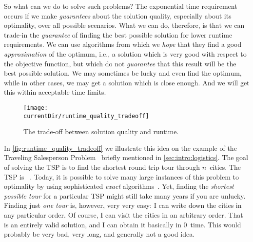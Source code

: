 So what can we do to solve such problems?
The exponential time requirement occurs if we make \emph{guarantees} about the solution quality, especially about its optimality, over all possible scenarios.
What we can do, therefore, is that we can trade-in the \emph{guarantee} of finding the best possible solution for lower runtime requirements.
We can use algorithms from which we \emph{hope} that they find a good \emph{approximation} of the optimum, i.e., a solution which is very good with respect to the objective function, but which do not \emph{guarantee} that this result will be the best possible solution.
We may sometimes be lucky and even find the optimum, while in other cases, we may get a solution which is close enough.
And we will get this within acceptable time limits.

\begin{figure}%
\centering%
\texttt{[image: \\currentDir/runtime\_quality\_tradeoff]}%
\caption{The trade-off between solution quality and runtime.}%
\label{fig:runtime_quality_tradeoff}%
\end{figure}

In \autoref{fig:runtime_quality_tradeoff} we illustrate this idea on the example of the Traveling Salesperson Problem~\cite{ABCC2006TTSPACS,LLRKS1985TTSPAGTOCO,GP2002TTSPAIV} briefly mentioned in \autoref{sec:intro:logistics}.
The goal of solving the \gls{TSP} is to find the shortest round trip tour through $n$~cities.
The \gls{TSP} is \NPhard~\cite{GJ1979CAIAGTTTONC,GP2002TTSPAIV}.
Today, it is possible to solve many large instances of this problem to optimality by using sophisticated \emph{exact} algorithms~\cite{CEG2007CWDPIFTSPT,C2021WT}.
Yet, finding the \emph{shortest possible tour} for a particular \gls{TSP} might still take many years if you are unlucky.
Finding just \emph{one tour} is, however, very very easy:
I can write down the cities in any particular order.
Of course, I can visit the cities in an arbitrary order.
That is an entirely valid solution, and I can obtain it basically in 0~time.
This  would probably be very bad, very long, and generally not a good idea.

